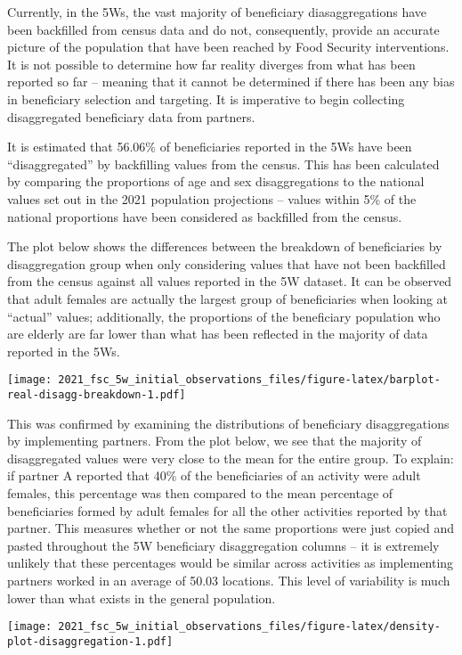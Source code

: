 \documentclass[
]{article}
\begin{document}
Currently, in the 5Ws, the vast majority of beneficiary diasaggregations
have been backfilled from census data and do not, consequently, provide
an accurate picture of the population that have been reached by Food
Security interventions. It is not possible to determine how far reality
diverges from what has been reported so far -- meaning that it cannot be
determined if there has been any bias in beneficiary selection and
targeting. It is imperative to begin collecting disaggregated
beneficiary data from partners.

It is estimated that 56.06\% of beneficiaries reported in the 5Ws have
been ``disaggregated'' by backfilling values from the census. This has
been calculated by comparing the proportions of age and sex
disaggregations to the national values set out in the 2021 population
projections -- values within 5\% of the national proportions have been
considered as backfilled from the census.

The plot below shows the differences between the breakdown of
beneficiaries by disaggregation group when only considering values that
have not been backfilled from the census against all values reported in
the 5W dataset. It can be observed that adult females are actually the
largest group of beneficiaries when looking at ``actual'' values;
additionally, the proportions of the beneficiary population who are
elderly are far lower than what has been reflected in the majority of
data reported in the 5Ws.

\texttt{[image: 2021\_fsc\_5w\_initial\_observations\_files/figure-latex/barplot-real-disagg-breakdown-1.pdf]}

This was confirmed by examining the distributions of beneficiary
disaggregations by implementing partners. From the plot below, we see
that the majority of disaggregated values were very close to the mean
for the entire group. To explain: if partner A reported that 40\% of the
beneficiaries of an activity were adult females, this percentage was
then compared to the mean percentage of beneficiaries formed by adult
females for all the other activities reported by that partner. This
measures whether or not the same proportions were just copied and pasted
throughout the 5W beneficiary disaggregation columns -- it is extremely
unlikely that these percentages would be similar across activities as
implementing partners worked in an average of 50.03 locations. This
level of variability is much lower than what exists in the general
population.

\texttt{[image: 2021\_fsc\_5w\_initial\_observations\_files/figure-latex/density-plot-disaggregation-1.pdf]}
\end{document}
